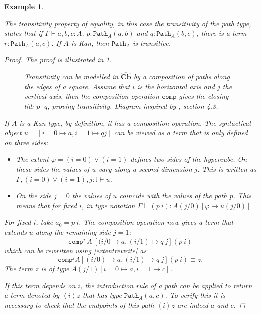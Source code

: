 \documentclass[12pt,a4paper,twoside,xetex]{book} %
\newcommand{\keyword}[1]{\emph{#1}\index{#1}}
\newtheorem{example}[theorem]{Example}
\newcommand{\psh}[1]{\widehat{#1}}
\newcommand{\op}[1]{\mathtt{#1}}
\newcommand{\cube}[0]{\textbf{Cb}}
\newcommand{\pa}[3]{\op{Path}_{#1}\left(#2, #3\right)}
\begin{document}
\begin{example}\label{pathtransitivity}

The \keyword{transitivity} property of equality, in this case the transitivity of the path type, 
states that if $\Gamma \vdash a,b,c : A$, $p: \op{Path}_A(a,b)$ and $q: 
\op{Path}_A(b,c)$, there is a term $r : \op{Path}_A(a,c)$. If $A$ is Kan, then 
$\op{Path}_A$ is transitive.	

\begin{proof}
The proof is illustrated in \cref{transdiag}.

\begin{figure}\label{transdiag}

\caption{Transitivity can be modelled in $\psh{\cube}$ by a  composition 
of paths along the edges of a square. Assume that $i$ is the horizontal axis and   $j$ the vertical axis, then the composition operation $\texttt{comp}$ gives the closing lid: $p \cdot q$, proving transitivity. Diagram inspired by \cite{Cohen2016}, 
section 4.3.}
\end{figure}

If $A$ is a Kan type, by definition, it has a composition operation. The 
syntactical object $u = [i=0 \mapsto a, i=1 \mapsto q j]$ can be viewed as a 
term that is only defined on three sides:

\begin{itemize}
\item The extent $\varphi = (i=0) \vee (i=1)$ defines two sides of the 
hypercube. On these sides the values of $u$ vary along a second dimension $j$. 
This is written as $\Gamma, (i=0)\vee (i=1), j : \mathbb{I} \vdash u$.
\item On the side $j=0$ the values of $u$ coincide with the values of the path 
$p$. This means that for fixed $i$, in type notation $\Gamma \vdash (p \  i) : 
A(j/0)[\varphi \mapsto u(j/0)]$

\end{itemize}

For fixed $i$, take $a_0 = p \  i$. The composition operation now gives a 
term that extends $u$ along the remaining side $j=1$: $$\op{comp}^j\ A\ [(i/0 
\mapsto a, (i/1) \mapsto q\ j] (p\ i)$$ which can be rewritten using  
\cref{extentrewrite} as $$\op{comp}^j A [(i/0) \mapsto a, (i/1) \mapsto q \ j] 
(p \  i) \equiv z.$$ The term $z$ is of type $A(j/1)[i=0 \mapsto a, i=1 \mapsto 
c]$.

If this term depends on $i$, the introduction rule of a 
path can be applied to return a term denoted by $\left< i \right> z$ that has 
type $\pa{A}{a}{c}$. To verify this it is necessary to check that the endpoints 
of this path $\left< i \right> z$ are indeed $a$ and $c$.


\end{proof}
\end{example}
\end{document}
